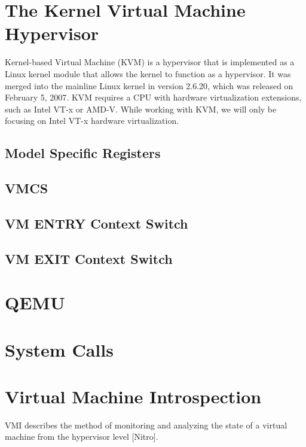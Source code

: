 \documentclass{report}
\begin{document}
\begin{spacing}{1.5}
\section{The Kernel Virtual Machine Hypervisor}


{\large 
Kernel-based Virtual Machine (KVM) is a hypervisor that is implemented as a Linux kernel module that allows the kernel to function as a hypervisor. It was merged into the mainline Linux kernel in version 2.6.20, which was released on February 5, 2007. KVM requires a CPU with hardware virtualization extensions, such as Intel VT-x or AMD-V. While working with KVM, we will only be focusing on Intel VT-x hardware virtualization.
\newline
}



\subsection{Model Specific Registers}
\subsection{VMCS}
\subsection{VM ENTRY Context Switch}
\subsection{VM EXIT Context Switch}
\section{QEMU}
\section{System Calls}
\section{Virtual Machine Introspection}


VMI describes the method of monitoring and analyzing the state of a virtual machine from the hypervisor level [Nitro]. 


\end{spacing}
\end{document}
